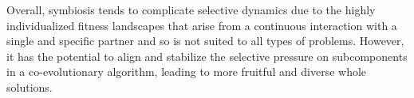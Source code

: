 Overall, symbiosis tends to complicate selective dynamics due to the highly individualized fitness landscapes that arise from a continuous interaction with a single and specific partner and so is not suited to all types of problems.
However, it has the potential to align and stabilize the selective pressure on subcomponents in a co-evolutionary algorithm, leading to more fruitful and diverse whole solutions.


